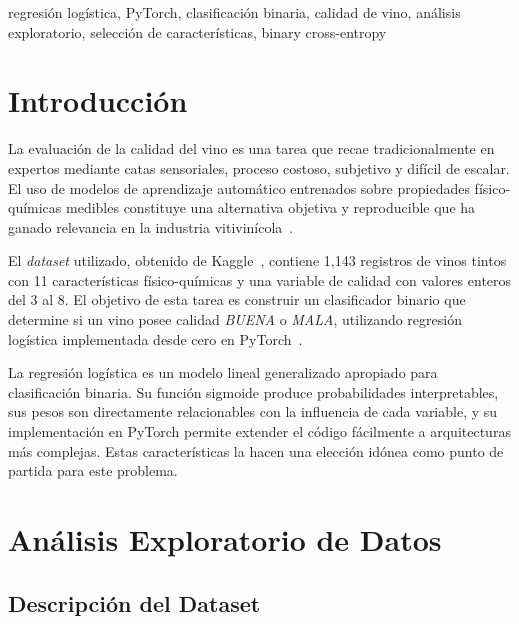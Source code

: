 \documentclass[conference]{IEEEtran}
\begin{document}
\begin{IEEEkeywords}
regresi\'{o}n log\'{i}stica, PyTorch, clasificaci\'{o}n binaria, calidad de vino, an\'{a}lisis exploratorio, selecci\'{o}n de caracter\'{i}sticas, binary cross-entropy
\end{IEEEkeywords}

\section{Introducci\'{o}n}

La evaluaci\'{o}n de la calidad del vino es una tarea que recae tradicionalmente en expertos mediante catas sensoriales, proceso costoso, subjetivo y dif\'{i}cil de escalar. El uso de modelos de aprendizaje autom\'{a}tico entrenados sobre propiedades f\'{i}sico-qu\'{i}micas medibles constituye una alternativa objetiva y reproducible que ha ganado relevancia en la industria vitivin\'{i}cola~\cite{cortez2009}.

El \textit{dataset} utilizado, obtenido de Kaggle~\cite{kaggle}, contiene 1{,}143 registros de vinos tintos con 11 caracter\'{i}sticas f\'{i}sico-qu\'{i}micas y una variable de calidad con valores enteros del 3 al 8. El objetivo de esta tarea es construir un clasificador binario que determine si un vino posee calidad \textit{BUENA} o \textit{MALA}, utilizando regresi\'{o}n log\'{i}stica implementada desde cero en PyTorch~\cite{pytorch}.

La regresi\'{o}n log\'{i}stica es un modelo lineal generalizado apropiado para clasificaci\'{o}n binaria. Su funci\'{o}n sigmoide produce probabilidades interpretables, sus pesos son directamente relacionables con la influencia de cada variable, y su implementaci\'{o}n en PyTorch permite extender el c\'{o}digo f\'{a}cilmente a arquitecturas m\'{a}s complejas. Estas caracter\'{i}sticas la hacen una elecci\'{o}n id\'{o}nea como punto de partida para este problema.

\section{An\'{a}lisis Exploratorio de Datos}

\subsection{Descripci\'{o}n del Dataset}
\end{document}
